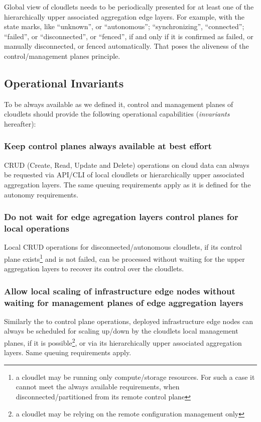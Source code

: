 \documentclass[conference]{IEEEtran}
\begin{document}
Global view of cloudlets needs to be periodically presented for at least one of
the hierarchically upper associated aggregation edge layers. For example, with
the state marks, like ``unknown'', or ``autonomous''; ``synchronizing'',
``connected''; ``failed'', or ``disconnected'', or ``fenced'', if and only if
it is confirmed as failed, or manually disconnected, or fenced automatically.
That poses the aliveness of the control/management planes principle.

\subsection{Operational Invariants}

To be always available as we defined it, control and management planes of
cloudlets should provide the following operational capabilities
(\textit{invariants} hereafter):

\subsubsection{Keep control planes always available at best effort}

CRUD (Create, Read, Update and Delete) operations on cloud data can always be
requested via API/CLI of local cloudlets or hierarchically upper associated
aggregation layers. The same queuing requirements apply as it is defined for
the autonomy requirements.

\subsubsection{Do not wait for edge agregation layers control planes for local
operations}

Local CRUD operations for disconnected/autonomous cloudlets,
if its control plane exists\footnote{a cloudlet may be running only
compute/storage resources. For such a case it cannot meet the always available
requirements, when disconnected/partitioned from its remote control plane} and
is not failed, can be processed without waiting for the upper aggregation
layers to recover its control over the cloudlets.

\subsubsection{Allow local scaling of infrastructure edge nodes without waiting
for management planes of edge aggregation layers}

Similarly the to control plane operations, deployed infrastructure edge nodes
can always be scheduled for scaling up/down by the cloudlets local management
planes, if it is possible\footnote{a cloudlet may be relying on the remote
configuration management only}, or via its hierarchically upper associated
aggregation layers. Same queuing requirements apply.
\end{document}
